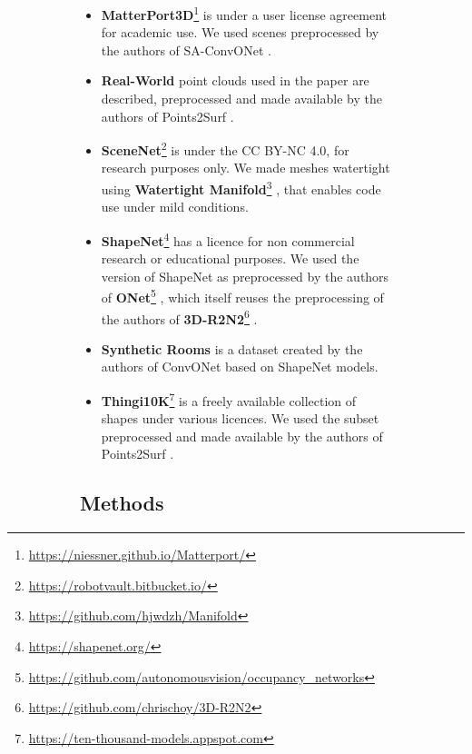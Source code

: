 \documentclass[10pt,twocolumn,letterpaper]{article}
\newcommand{\footnoteref}[1]{}
\begin{document}
\begin{figure}[t]
\begin{figure}[t]
\begin{itemize}[itemsep=4pt,topsep=4pt, parsep=0pt]
    \item \textbf{MatterPort3D}\footnote{\label{foot:matterport3d}\url{https://niessner.github.io/Matterport/}} \cite{chang2017matterport3d} is under a user license agreement for academic use. We used scenes preprocessed by the authors of SA-ConvONet\footnoteref{foot:saconvonet} \cite{tang2021sign}.

    \item \textbf{Real-World} point clouds used in the paper are described, preprocessed and made available by the authors of Points2Surf\footnoteref{foot:points2surf} \cite{Erler2020Points2Surf}.

    \item \textbf{SceneNet}\footnote{\url{https://robotvault.bitbucket.io/}} \cite{handa2015scenenet, handa2016scenenet, Handa2016Understanding} is under the CC BY-NC 4.0,
    for research purposes only. We made meshes watertight using \textbf{Watertight Manifold}\footnote{\label{foot:watertightmanifold}\url{https://github.com/hjwdzh/Manifold}} \cite{huang2018robust}, that enables code use under mild conditions.

    \item \textbf{ShapeNet}\footnote{\label{foot:shapenet}\url{https://shapenet.org/}} \cite{Chang2015ARXIV} has a licence for non commercial research or educational purposes. We used the version of ShapeNet as preprocessed by the authors of \textbf{ONet}\footnote{\label{foot:onet}\url{https://github.com/autonomousvision/occupancy_networks}}  \cite{Mescheder2019CVPR}, which itself reuses the preprocessing of the authors of \textbf{3D-R2N2}\footnote{\label{foot:3dr2n2}\url{https://github.com/chrischoy/3D-R2N2}} \cite{Choy2016ECCV}.

    \item \textbf{Synthetic Rooms}\footnoteref{foot:convonet} is a dataset created by the authors of ConvONet \cite{Peng2020ECCV} based on ShapeNet models.

    \item \textbf{Thingi10K}\footnote{\label{foot:thingi10k}\url{https://ten-thousand-models.appspot.com}} \cite{zhou2016thingi10k} is a freely available collection of shapes under various licences. We used the subset preprocessed and made available by the authors of Points2Surf\footnoteref{foot:points2surf} \cite{Erler2020Points2Surf}.

\end{itemize}


\subsection{Methods}\label{sec:assetsmethods}


\end{figure}
\end{figure}
\end{document}
